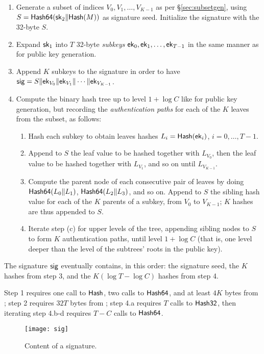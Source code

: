 \begin{enumerate}

\item Generate a subset of indices $V_0, V_1,\dots,V_{K-1}$ as per \S\ref{sec:subsetgen}, using $S=\textsf{Hash64}(\mathsf{sk}_2 \Vert \textsf{Hash}(M))$ as signature seed. Initialize the signature with the 32-byte $S$.

\item Expand $\mathsf{sk}_1$ into $T$ 32-byte \emph{subkeys} $\mathsf{ek}_0, \mathsf{ek}_1, \dots, \mathsf{ek}_{T-1}$ in the same manner as for public key generation.

\item Append $K$ subkeys to the signature in order to have $\mathsf{sig}= S \Vert \mathsf{ek}_{V_0}\Vert \mathsf{ek}_{V_1}\Vert \cdots \Vert \mathsf{ek}_{V_{K-1}}$.

\item Compute the binary hash tree up to level $1 + \log C$ like for public key generation, but recording the \emph{authentication paths} for each of the $K$ leaves from the subset, as follows:
\begin{enumerate}
\item Hash each subkey to obtain leaves hashes $L_i=\textsf{Hash}(\mathsf{ek}_i)$, $i=0,\dots,T-1$.
\item Append to $S$ the leaf value to be hashed together with $L_{V_0}$, then the leaf value to be hashed together with $L_{V_1}$, and so on until $L_{V_{K-1}}$.
\item Compute the parent node of each consecutive pair of leaves by doing $\textsf{Hash64}(L_0\Vert L_1)$, $\textsf{Hash64}(L_2\Vert L_3)$, and so on. Append to $S$ the sibling hash value for each of the $K$ parents of a subkey, from $V_0$ to $V_{K-1}$; $K$ hashes are thus appended to $S$.
\item Iterate step (c) for upper levels of the tree, appending sibling nodes to $S$ to form $K$ authentication paths, until level $1 + \log C$ (that is, one level deeper than the level of the subtrees' roots in the public key).
\end{enumerate}
\end{enumerate}
The signature $\mathsf{sig}$ eventually contains, in this order: the signature seed, the $K$ hashes from step 3, and the $K(\log T - \log C)$ hashes from step 4.

Step 1 requires one call to $\textsf{Hash}$, two calls to $\textsf{Hash64}$, and at least $4K$ bytes from \drbg; step 2 requires $32T$ bytes from \drbg; step 4.a requires $T$ calls to $\textsf{Hash32}$, then iterating step 4.b-d requires $T-C$ calls to $\textsf{Hash64}$.


\begin{figure}
\texttt{[image: sig]}
\caption{Content of a signature.}
\end{figure}

